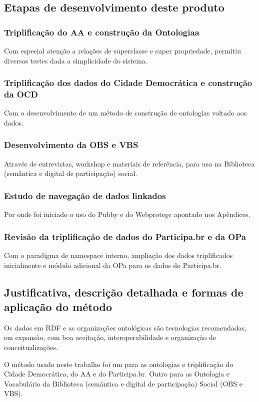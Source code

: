 \documentclass[12pt]{article}
\begin{document}
\subsection{Etapas de desenvolvimento deste produto}
\subsubsection{Triplificação do AA e construção da Ontologiaa}
Com especial atenção a relações de superclasse e super propriedade, permitiu diversos testes dada a simplicidade do sistema.
\subsubsection{Triplificação dos dados do Cidade Democrática e construção da OCD}
Com o desenvolvimento de um método de construção de ontologias voltado aos dados.
\subsubsection{Desenvolvimento da OBS e VBS}
Através de entrevistas, workshop e materiais de referência, para uso na Biblioteca (semântica e digital de participação) social.
\subsubsection{Estudo de navegação de dados linkados}
Por onde foi iniciado o uso do Pubby e do Webprotege apontado nos Apêndices.
\subsubsection{Revisão da triplificação de dados do Participa.br e da OPa}
Com o paradigma de namespace interno, ampliação dos dados triplificados inicialmente e módulo adicional da OPa para os dados do Participa.br.

\subsection{Justificativa, descrição detalhada e formas de aplicação do método}
Os dados em RDF e as organizações ontológicas são tecnologias recomendadas, em expansão, com boa aceitação, interoperabilidade e organização de conceitualizações.

O método usado neste trabalho foi um para as ontologias e triplificação do Cidade Democrática, do AA e do Participa.br. Outro para as Ontologia e Vocabulário da Biblioteca (semântica e digital de participação) Social (OBS e VBS).
\end{document}
